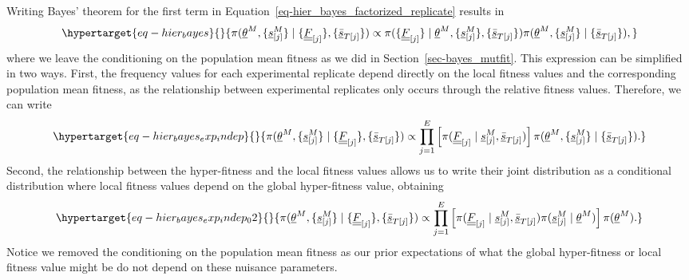 \documentclass[
]{scrartcl}
\begin{document}
\begin{refsegment}
Writing Bayes' theorem for the first term in
Equation~\ref{eq-hier_bayes_factorized_replicate} results in
\begin{equation}\protect\hypertarget{eq-hier_bayes}{}{
\pi(
    \underline{\theta}^M, 
    \{\underline{s}^M_{[j]}\} \mid
    \{\underline{\underline{F}}_{[j]}\},
    \{\underline{\bar{s}}_{T[j]}\}
) \propto
\pi(
    \{\underline{\underline{F}}_{[j]}\} \mid
    \underline{\theta}^M, 
    \{\underline{s}^M_{[j]}\},
    \{\underline{\bar{s}}_{T[j]}\}
)
\pi(
    \underline{\theta}^M, 
    \{\underline{s}^M_{[j]}\} \mid
    \{\underline{\bar{s}}_{T[j]}\}
),
}\label{eq-hier_bayes}\end{equation} where we leave the conditioning on
the population mean fitness as we did in Section~\ref{sec-bayes_mutfit}.
This expression can be simplified in two ways. First, the frequency
values for each experimental replicate depend directly on the local
fitness values and the corresponding population mean fitness, as the
relationship between experimental replicates only occurs through the
relative fitness values. Therefore, we can write
\begin{equation}\protect\hypertarget{eq-hier_bayes_exp_indep}{}{
\pi(
    \underline{\theta}^M, 
    \{\underline{s}^M_{[j]}\} \mid
    \{\underline{\underline{F}}_{[j]}\},
    \{\underline{\bar{s}}_{T[j]}\}
) \propto
\prod_{j=1}^E\left[
    \pi(
        \underline{\underline{F}}_{[j]} \mid
        \underline{s}^M_{[j]},
        \underline{\bar{s}}_{T[j]}
    )
\right]
\pi(
    \underline{\theta}^M, 
    \{\underline{s}^M_{[j]}\} \mid
    \{\underline{\bar{s}}_{T[j]}\}
).
}\label{eq-hier_bayes_exp_indep}\end{equation} Second, the relationship
between the hyper-fitness and the local fitness values allows us to
write their joint distribution as a conditional distribution where local
fitness values depend on the global hyper-fitness value, obtaining
\begin{equation}\protect\hypertarget{eq-hier_bayes_exp_indep_02}{}{
\pi(
    \underline{\theta}^M, 
    \{\underline{s}^M_{[j]}\} \mid
    \{\underline{\underline{F}}_{[j]}\},
    \{\underline{\bar{s}}_{T[j]}\}
) \propto
\prod_{j=1}^E\left[
    \pi(
        \underline{\underline{F}}_{[j]} \mid
        \underline{s}^M_{[j]},
        \underline{\bar{s}}_{T[j]}
    )
    \pi(
        \underline{s}^M_{[j]} \mid
        \underline{\theta}^M
    )
\right] 
\pi(
    \underline{\theta}^M
).
}\label{eq-hier_bayes_exp_indep_02}\end{equation} Notice we removed the
conditioning on the population mean fitness as our prior expectations of
what the global hyper-fitness or local fitness value might be do not
depend on these nuisance parameters.


\end{refsegment}
\end{document}
